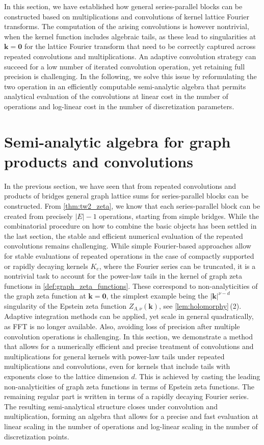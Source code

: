 \documentclass[]{amsart}
\numberwithin{mythm}{section}
\begin{document}
In this section, we have established how general series-parallel blocks can be constructed based on multiplications and convolutions of kernel lattice Fourier transforms. The computation of the arising convolutions is however nontrivial, when the kernel function includes algebraic tails, as these lead to singularities at $\bm k=\bm 0$ for the lattice Fourier transform that need to be correctly captured across repeated convolutions and multiplications. An adaptive convolution strategy can succeed for a low number of iterated convolution operation, yet retaining full precision is challenging. In the following, we solve this issue by reformulating the two operation in an efficiently computable semi-analytic algebra that permits analytical evaluation of the convolutions at linear cost in the number of operations and log-linear cost in the number of discretization parameters.


\section{Semi-analytic algebra for graph products and convolutions}
\label{sec:algebra}



In the previous section, we have seen that from repeated convolutions and products of bridges general graph lattice sums for series-parallel blocks can be constructed. From \cref{thm:tw2_zeta}, we know that each series-parallel block can be created from precisely $\vert E\vert-1$ operations, starting from simple bridges. 
While the combinatorial procedure on how to combine the basic objects has been settled in the last section, the stable and efficient numerical evaluation of the repeated convolutions remains challenging.  
While simple Fourier-based approaches allow for stable evaluations of repeated operations in the case of compactly supported or rapidly decaying kernels $K_e$, where the Fourier series can be truncated, it is a nontrivial task to account for the power-law tails in the kernel of graph zeta functions in \cref{def:graph_zeta_functions}. 
These correspond to non-analyticities of the graph zeta function at $\bm k=\bm 0$, the simplest example being the $|\bm k|^{\nu-d}$ singularity of the Epstein zeta function $Z_{\Lambda,\nu}(\bm k)$, see \cref{lem:holomorphy}\,(2). Adaptive integration methods can be applied, yet scale in general quadratically, as FFT is no longer available. Also, avoiding loss of precision after multiple convolution operations is challenging. In this section, we demonstrate a method that allows for a numerically efficient and precise treatment of convolutions and multiplications for general kernels with power-law tails under repeated multiplications and convolutions, even for kernels that include tails with exponents close to the lattice dimension $d$. This is achieved by casting the leading non-analyticities of graph zeta functions in terms of Epstein zeta functions. The remaining regular part is written in terms of a rapidly decaying Fourier series. The resulting semi-analytical structure closes under convolution and multiplication, forming an algebra that  allows for a precise and fast evaluation at linear scaling in the number of operations and log-linear scaling in the number of discretization points. 
\end{document}

